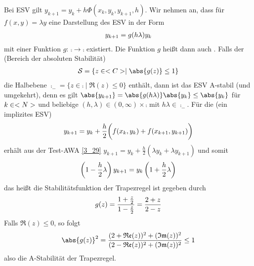 Bei ESV gilt $y_{k+1}=y_k + h\Phi(x_k,y_k,y_{k+1},h)$. Wir nehmen an, dass für $f(x,y)=\lambda y$ eine Darstellung des ESV in der Form
\begin{align}
	y_{k+1} = g(h\lambda)y_k \notag
\end{align}
mit einer Funktion $g$: $\comp\to\comp$ existiert. Die Funktion $g$ heißt dann auch . Falls der  (Bereich der absoluten Stabilität)
\begin{align}
	\mathcal{S} = \{z\in\comp\mid \abs{g(z)}\le 1\}\notag
\end{align}
die Halbebene $\comp_-=\{z\in\comp\mid \Re(z)\le 0\}$ enthält, dann ist das ESV A-stabil (und umgekehrt), denn es gilt $\abs{y_{k+1}} = \abs{g(h\lambda)}\abs{y_k}\le \abs{y_k}$ für $k\in<N>$ und beliebige $(h,\lambda)\in (0,\infty)\times\comp$ mit $h\lambda\in\comp_-$. Für die  (ein implizites ESV)
\begin{align}
	y_{k+1} = y_k + \frac{h}{2}\bigg(f(x_k,y_k) + f(x_{k+1},y_{k+1})\bigg) \notag
\end{align}
erhält aus der Test-AWA \cref{3_29} $y_{k+1} = y_k + \frac{h}{2}(\lambda y_k + \lambda y_{k+1})$ und somit
\begin{align}
	\left(1-\frac{h}{2}\lambda\right)y_{k+1} = y_k\left(1+\frac{h}{2}\lambda\right)\notag
\end{align}
das heißt die Stabilitätsfunktion der Trapezregel ist gegeben durch
\begin{align}
	g(z) = \frac{1+\frac{z}{2}}{1-\frac{z}{2}} = \frac{2+z}{2-z}\notag
\end{align}
Falls $\Re(z)\le 0$, so folgt
\begin{align}
	\abs{g(z)}^2 = \frac{(2+\Re(z))^2 + (\Im(z))^2}{(2-\Re(z))^2 + (\Im(z))^2} \le 1\notag
\end{align}
also die A-Stabilität der Trapezregel.

